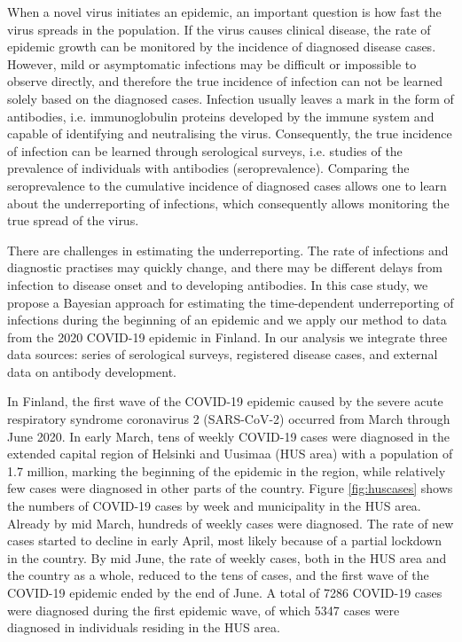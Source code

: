\documentclass[aoas]{imsart}
\begin{document}
When a novel virus initiates an epidemic, an important question is how fast the virus spreads in the population. If the virus causes clinical disease, the rate of epidemic growth can be monitored by the incidence of diagnosed disease cases. However, mild or asymptomatic infections may be difficult or impossible to observe directly, and therefore the true incidence of infection can not be learned solely based on the diagnosed cases. Infection usually leaves a mark in the form of antibodies, i.e. immunoglobulin proteins developed by the immune system and capable of identifying and neutralising the virus. Consequently, the true incidence of infection can be learned through serological surveys, i.e. studies of the prevalence of individuals with antibodies (seroprevalence). Comparing the seroprevalence to the cumulative incidence of diagnosed cases allows one to learn about the underreporting of infections, which consequently allows monitoring the true spread of the virus. 

There are challenges in estimating the underreporting. The rate of infections and diagnostic practises may quickly change, and there may be different delays from infection to disease onset and to developing antibodies. In this case study, we propose a Bayesian approach for estimating the time-dependent underreporting of infections during the beginning of an epidemic and we apply our method to data from the 2020 COVID-19 epidemic in Finland. In our analysis we integrate three data sources: series of serological surveys, registered disease cases, and external data on antibody development.

In Finland, the first wave of the COVID-19 epidemic caused by the severe acute respiratory syndrome coronavirus 2 (SARS-CoV-2) occurred from March through June 2020. In early March, tens of weekly COVID-19 cases were diagnosed in the extended capital region of Helsinki and Uusimaa (HUS area) with a population of 1.7 million, marking the beginning of the epidemic in the region, while relatively few cases were diagnosed in other parts of the country. Figure \ref{fig:huscases} shows the numbers of COVID-19 cases by week and municipality in the HUS area. Already by mid March, hundreds of weekly cases were diagnosed. The rate of new cases started to decline in early April, most likely because of a partial lockdown in the country. By mid June, the rate of weekly cases, both in the HUS area and the country as a whole, reduced to the tens of cases, and the first wave of the COVID-19 epidemic ended by the end of June. A total of 7286 COVID-19 cases were diagnosed during the first epidemic wave, of which 5347 cases were diagnosed in individuals residing in the HUS area. 
\end{document}
